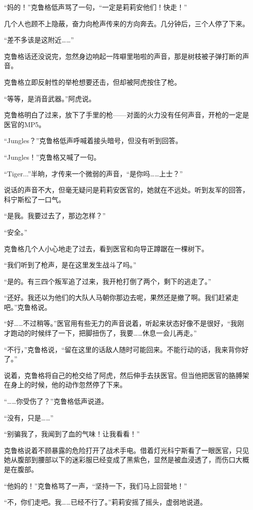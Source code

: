 “妈的！”克鲁格低声骂了一句，“一定是莉莉安他们！快走！”

几个人也顾不上隐蔽，奋力向枪声传来的方向奔去。几分钟后，三个人停了下来。

“差不多该是这附近……”

克鲁格话还没说完，忽然身边响起一阵噼里啪啦的声音，那是树枝被子弹打断的声音。

克鲁格立即反射性的举枪想要还击，但却被阿虎按住了枪。

“等等，是消音武器。”阿虎说。

克鲁格明白了过来，放下了手里的枪——对面的火力没有任何声音，开枪的一定是医官的MP5。

“Jungles？”克鲁格低声呼喊着接头暗号，但没有听到回答。

“Jungles！”克鲁格又喊了一句。

“Tiger...”半晌，才传来一个微弱的声音，“是你吗……上士？”

说话的声音不大，但毫无疑问是莉莉安医官的，她就在不远处。听到友军的回答，科宁斯松了一口气。

“是我。我要过去了，那边怎样？”

“安全。”

克鲁格几个人小心地走了过去，看到医官和向导正蹲踞在一棵树下。

“我们听到了枪声，是在这里发生战斗了吗。”

“是的。有三四个叛军追了过来，我开枪打倒了两个，剩下的逃走了。”

“还好。我还以为他们的大队人马朝你那边去呢，果然还是撤了啊。我们赶紧走吧。”克鲁格说。

“好……不过稍等。”医官用有些无力的声音说着，听起来状态好像不是很好，“我刚才跑动的时候绊了一下，把脚扭伤了，我要……休息一会儿再走。”

“不行，”克鲁格说，“留在这里的话敌人随时可能回来。不能行动的话，我来背你好了。”

说着，克鲁格将自己的枪交给了阿虎，然后伸手去扶医官。但当他把医官的胳膊架在身上的时候，他的动作忽然停了下来。

“……你受伤了？”克鲁格低声说道。

“没有，只是……”

“别骗我了，我闻到了血的气味！让我看看！”

克鲁格说着不顾暴露的危险打开了战术手电。借着灯光科宁斯看了一眼医官，只见她从腹部到腰部以下的迷彩服已经变成了黑紫色，显然是被血浸透了，而伤口大概是在腹部。

“他妈的！”克鲁格骂了一声，“坚持一下，我们马上回营地！”

“不，你们走吧。我……已经不行了。”莉莉安摇了摇头，虚弱地说道。

